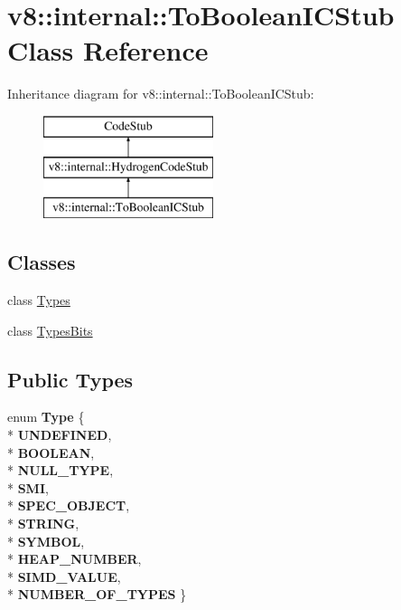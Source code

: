 \hypertarget{classv8_1_1internal_1_1_to_boolean_i_c_stub}{}\section{v8\+:\+:internal\+:\+:To\+Boolean\+I\+C\+Stub Class Reference}
\label{classv8_1_1internal_1_1_to_boolean_i_c_stub}
Inheritance diagram for v8\+:\+:internal\+:\+:To\+Boolean\+I\+C\+Stub\+:\begin{figure}[H]
\begin{center}
\leavevmode
\includegraphics[height=3.000000cm]{classv8_1_1internal_1_1_to_boolean_i_c_stub}
\end{center}
\end{figure}
\subsection*{Classes}
\begin{DoxyCompactItemize}
\item 
class \hyperlink{classv8_1_1internal_1_1_to_boolean_i_c_stub_1_1_types}{Types}
\item 
class \hyperlink{classv8_1_1internal_1_1_to_boolean_i_c_stub_1_1_types_bits}{Types\+Bits}
\end{DoxyCompactItemize}
\subsection*{Public Types}
\begin{DoxyCompactItemize}
\item 
enum {\bfseries Type} \{ \\*
{\bfseries U\+N\+D\+E\+F\+I\+N\+ED}, 
\\*
{\bfseries B\+O\+O\+L\+E\+AN}, 
\\*
{\bfseries N\+U\+L\+L\+\_\+\+T\+Y\+PE}, 
\\*
{\bfseries S\+MI}, 
\\*
{\bfseries S\+P\+E\+C\+\_\+\+O\+B\+J\+E\+CT}, 
\\*
{\bfseries S\+T\+R\+I\+NG}, 
\\*
{\bfseries S\+Y\+M\+B\+OL}, 
\\*
{\bfseries H\+E\+A\+P\+\_\+\+N\+U\+M\+B\+ER}, 
\\*
{\bfseries S\+I\+M\+D\+\_\+\+V\+A\+L\+UE}, 
\\*
{\bfseries N\+U\+M\+B\+E\+R\+\_\+\+O\+F\+\_\+\+T\+Y\+P\+ES}
 \}\hypertarget{classv8_1_1internal_1_1_to_boolean_i_c_stub_a6a7fe7d8cf249c940ef805d44418b268}{}\label{classv8_1_1internal_1_1_to_boolean_i_c_stub_a6a7fe7d8cf249c940ef805d44418b268}

\end{DoxyCompactItemize}
